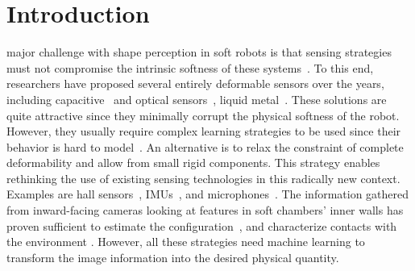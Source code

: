 \section{Introduction}\label{sec:srslam:introduction}
%
 major challenge with shape perception in soft robots is that sensing strategies must not compromise the intrinsic softness of these systems~\citep{polygerinos2017soft,wang2018toward}. %
%
To this end, researchers have proposed several entirely deformable sensors over the years, including capacitive~\citep{scimeca2019model} and optical sensors~\citep{li2021scaling}, liquid metal~\citep{wall2017method}. These solutions are quite attractive since they minimally corrupt the physical softness of the robot. However, they usually require complex learning strategies to be used since their behavior is hard to model~\citep{thuruthel2019soft,truby2020distributed}.
%
% 
An alternative is to relax the constraint of complete deformability and allow from small rigid components. This strategy enables rethinking the use of existing sensing technologies in this radically new context. Examples are hall sensors~\citep{guo2019continuum}, IMUs~\citep{hughes2020sensing}, and microphones~\citep{zoller2018acoustic}. %
%
The information gathered from inward-facing cameras looking at features in soft chambers' inner walls has proven sufficient to estimate the configuration~\citep{she2020exoskeleton,werner2020vision}, and characterize contacts with the environment \citep{ward2018tactip,lin2020curvature}. However, all these strategies need machine learning to transform the image information into the desired physical quantity.
%
